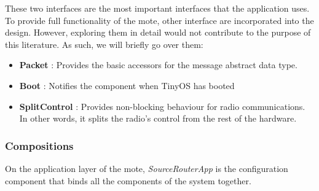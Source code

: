 \documentclass[11pt, titlepage, oneside]{article}
\begin{document}
These two interfaces are the most important interfaces that the application uses. To provide full functionality of the mote, other interface are incorporated into the design. However, exploring them in detail would not contribute to the purpose of this literature. As such, we will briefly go over them: 
 
\begin{itemize} 
\item {\bf Packet} : Provides the basic accessors for the message abstract data type. 
\item {\bf Boot} : Notifies the component when TinyOS has booted 
\item {\bf SplitControl} : Provides non-blocking behaviour for radio communications. In other words, it splits the radio's control from the rest of the hardware. 
\end{itemize} 
 \subsubsection{Compositions}
On the application layer of the mote, {\it SourceRouterApp} is the configuration component that binds all the components of the system together. 
 
\end{document}
